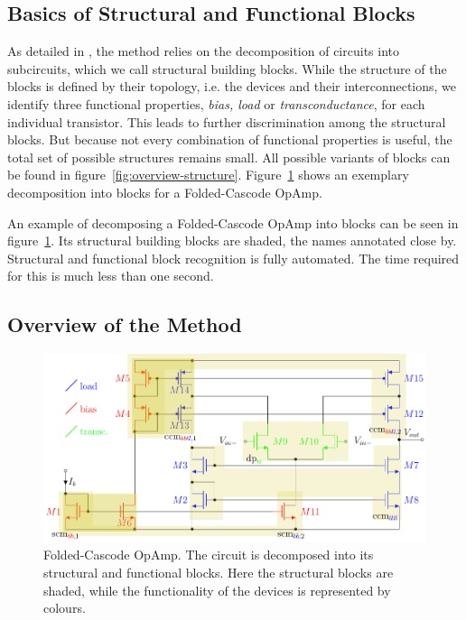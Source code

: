 \documentclass[conference]{IEEEtran}
\begin{document}
 	\subsection{Basics of Structural and Functional Blocks}
 	As detailed in \cite{ leibl24inverse}, the method  relies on the decomposition of circuits into subcircuits, which we call structural building blocks.
 	While the structure of the blocks is defined by their topology, i.e. the devices and their interconnections, we identify three functional properties, \textit{bias, load} or \textit{transconductance}, for each individual transistor. This leads to further discrimination among the structural blocks. But because not every combination of functional properties is useful, the total set of possible structures remains small. 
	All possible variants of blocks can be found in figure~\ref{fig:overview-structure}. Figure~\ref{fig:simple53} shows an exemplary decomposition into blocks for a Folded-Cascode OpAmp.
	
	An example of decomposing a Folded-Cascode OpAmp into blocks can be seen in figure~\ref{fig:simple53}. Its structural building blocks are shaded, the names annotated close by.
	Structural and functional block recognition is fully automated. The time required for this is much less than one second. 
	
\subsection{Overview of the Method}
	\begin{figure}[]
		\centering
		\includegraphics[width=\linewidth]{figures/simple52_partitioning}
		\caption{Folded-Cascode OpAmp. The circuit is decomposed into its structural and functional blocks. Here the structural blocks are shaded, while the functionality of the devices is represented by colours. }
		\label{fig:simple53}
	\end{figure}
	
\end{document}
